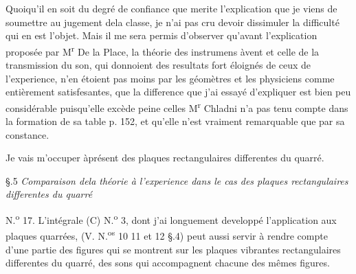 \documentclass[11pt,a4paper]{article}
\begin{document}
Quoiqu'il en soit du degré de confiance que merite
l'explication que je viens de soumettre au jugement dela
classe, je n'ai pas cru devoir dissimuler la difficulté
qui  en est l'objet. Mais il me sera permis d'observer
qu'avant l'explication proposée par M\textsuperscript{r} De la Place,
la théorie des instrumens àvent et celle de la transmission
du son, qui  donnoient des resultats fort
éloignés de ceux de l'experience, n'en étoient pas moins
  par les géomètres et les physiciens comme entièrement
satisfesantes,  que  la difference que j'ai essayé d'expliquer
est bien peu considérable puisqu'elle  excède   peine
 celles   M\textsuperscript{r} Chladni n'a pas tenu compte dans
la formation de sa table p. 152, et qu'elle n'est vraiment
remarquable que par sa constance.

Je vais m'occuper àprésent des plaques rectangulaires differentes du
quarré.


§.5 \emph{Comparaison dela théorie à l'experience dans le cas des plaques
rectangulaires differentes du quarré}

N.\textsuperscript{o} 17. L'intégrale (C) N.\textsuperscript{o} 3, dont j'ai longuement developpé l'application
aux plaques quarrées, (V. N.\textsuperscript{os} 10 11 et 12 §.4) peut aussi servir à rendre
compte d'une partie des figures qui se  montrent sur les plaques
vibrantes  rectangulaires differentes du quarré, 
  des sons qui accompagnent chacune des mêmes figures.
\end{document}
